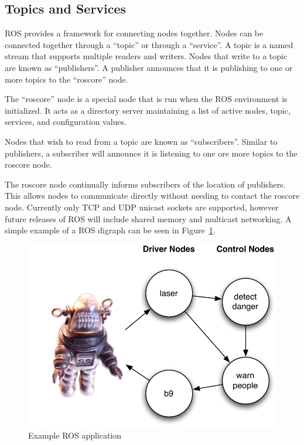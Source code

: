 
\subsection{Topics and Services}
ROS provides a framework for connecting nodes together. Nodes can be connected together through a ``topic'' or through a ``service''. A topic is a named stream that supports multiple readers and writers. Nodes that write to a topic are known as ``publishers''. A publisher announces that it is publishing to one or more topics to the ``roscore'' node. 

The ``roscore'' node is a special node that is run when the ROS environment is initialized. It acts as a directory server maintaining a list of active nodes, topic, services, and configuration values.

Nodes that wish to read from a topic are known as ``subscribers''. Similar to publishers, a subscriber will announce it is listening to one ore more topics to the roscore node.

The roscore node continually informs subscribers of the location of publishers. This allows nodes to communicate directly without needing to contact the roscore node. Currently only TCP and UDP unicast sockets are supported, however future releases of ROS will include shared memory and multicast networking. A simple example of a ROS digraph can be seen in Figure~\ref{fig:middleware-ros}.

\begin{figure}[ht]
\includegraphics{images/middleware-ros.pdf}
\caption{Example ROS application\label{fig:middleware-ros}}
\end{figure}

